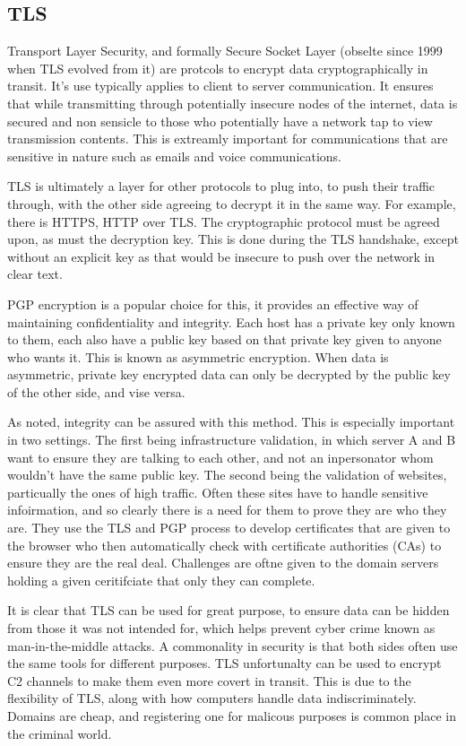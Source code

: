 \subsection{TLS}
Transport Layer Security, and formally Secure Socket Layer (obselte since 1999 when TLS evolved from it) are protcols to encrypt data cryptographically in transit. It's use typically applies to client to server communication. It ensures that while transmitting through potentially insecure nodes of the internet, data is secured and non sensicle to those who potentially have a network tap to view transmission contents. This is extreamly important for communications that are sensitive in nature such as emails and voice communications. \citep{CloudflareTLS}

TLS is ultimately a layer for other protocols to plug into, to push their traffic through, with the other side agreeing to decrypt it in the same way. For example, there is HTTPS, HTTP over TLS. The cryptographic protocol must be agreed upon, as must the decryption key. This is done during the TLS handshake, except without an explicit key as that would be insecure to push over the network in clear text. \citep{CloudflareTLS}

PGP encryption is a popular choice for this, it provides an effective way of maintaining confidentiality and integrity. Each host has a private key only known to them, each also have a public key based on that private key given to anyone who wants it. This is known as asymmetric encryption. When data is asymmetric, private key encrypted data can only be decrypted by the public key of the other side, and vise versa.  

As noted, integrity can be assured with this method. This is especially important in two settings. The first being infrastructure validation, in which server A and B want to ensure they are talking to each other, and not an inpersonator whom wouldn't have the same public key. The second being the validation of websites, particually the ones of high traffic. Often these sites have to handle sensitive infoirmation, and so clearly there is a need for them to prove they are who they are. They use the TLS and PGP process to develop certificates that are given to the browser who then automatically check with certificate authorities (CAs) to ensure they are the real deal. Challenges are oftne given to the domain servers holding a given ceritifciate that only they can complete.

It is clear that TLS can be used for great purpose, to ensure data can be hidden from those it was not intended for, which helps prevent cyber crime known as man-in-the-middle attacks. A commonality in security is that both sides often use the same tools for different purposes. TLS unfortunalty can be used to encrypt C2 
channels to make them even more covert in transit. This is due to the flexibility of TLS, along with how computers handle data indiscriminately. Domains are cheap, and registering one for malicous purposes is common place in the criminal world. \citep{TLS}

